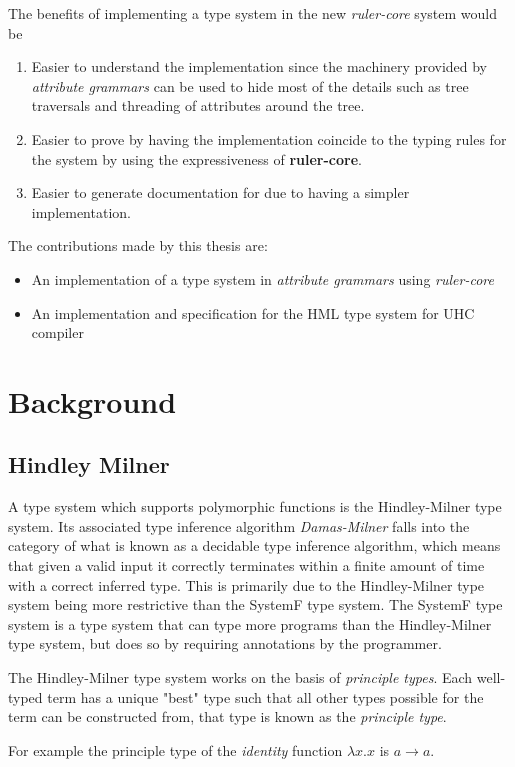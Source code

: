 \documentclass[twoside, titlepage, openright, a4paper]{book}
\newcommand{\ags}{\emph{attribute grammars }}
\newcommand{\rcore}{\emph{ruler-core }}
\begin{document}
The benefits of implementing a type system in the new \rcore system would be

\begin{enumerate}
\item Easier to understand the implementation since the machinery provided by \ags can be used to hide most of the details such as tree traversals and threading of attributes around the tree.
\item Easier to prove by having the implementation coincide to the typing rules for the system by using the expressiveness of \textbf{ruler-core}.
\item Easier to generate documentation for due to having a simpler implementation.
\end{enumerate}

The contributions made by this thesis are:
\begin{itemize}
\item An implementation of a type system in \ags using \rcore
\item An implementation and specification for the HML type system for UHC compiler
\end{itemize}

\chapter{Background}
\section{Hindley Milner}
A type system which supports polymorphic functions is the Hindley-Milner\cite{HM} type system. Its associated type inference algorithm \emph{Damas-Milner} falls into the category of what is known as a decidable type inference algorithm, which means that given a valid input it correctly terminates within a finite amount of time with a correct inferred type. This is primarily due to the Hindley-Milner type system being more restrictive than the SystemF type system. The SystemF type system is a type system that can type more programs than the Hindley-Milner type system, but does so by requiring annotations by the programmer.

The Hindley-Milner type system works on the basis of \textit{principle types}. Each well-typed term has a unique "best" type such that all other types possible for the term can be constructed from, that type is known as the \textit{principle type}. 

For example the principle type of the \textit{identity} function $\lambda x.x$  is $a \rightarrow a$.
\end{document}
